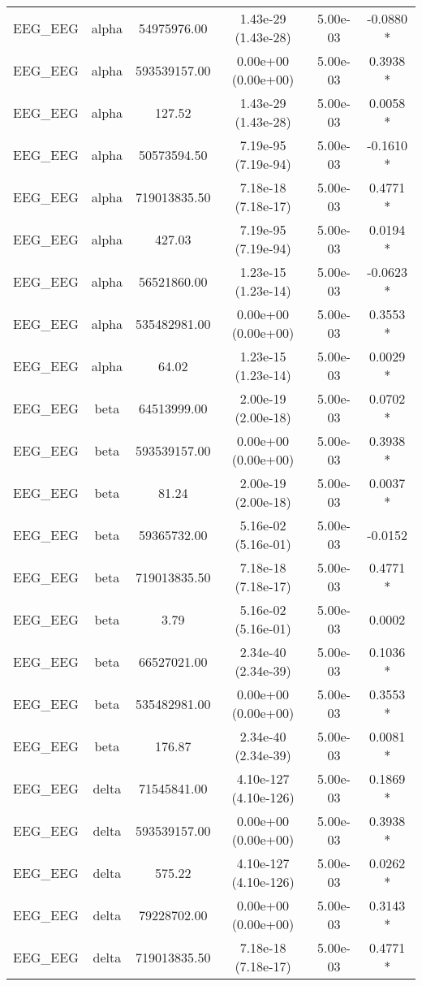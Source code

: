 \begin{tabular}{lccccc}
EEG\_EEG & alpha & 54975976.00 & 1.43e-29 (1.43e-28) & 5.00e-03 & -0.0880 * \\
EEG\_EEG & alpha & 593539157.00 & 0.00e+00 (0.00e+00) & 5.00e-03 & 0.3938 * \\
EEG\_EEG & alpha & 127.52 & 1.43e-29 (1.43e-28) & 5.00e-03 & 0.0058 * \\
EEG\_EEG & alpha & 50573594.50 & 7.19e-95 (7.19e-94) & 5.00e-03 & -0.1610 * \\
EEG\_EEG & alpha & 719013835.50 & 7.18e-18 (7.18e-17) & 5.00e-03 & 0.4771 * \\
EEG\_EEG & alpha & 427.03 & 7.19e-95 (7.19e-94) & 5.00e-03 & 0.0194 * \\
EEG\_EEG & alpha & 56521860.00 & 1.23e-15 (1.23e-14) & 5.00e-03 & -0.0623 * \\
EEG\_EEG & alpha & 535482981.00 & 0.00e+00 (0.00e+00) & 5.00e-03 & 0.3553 * \\
EEG\_EEG & alpha & 64.02 & 1.23e-15 (1.23e-14) & 5.00e-03 & 0.0029 * \\
EEG\_EEG & beta & 64513999.00 & 2.00e-19 (2.00e-18) & 5.00e-03 & 0.0702 * \\
EEG\_EEG & beta & 593539157.00 & 0.00e+00 (0.00e+00) & 5.00e-03 & 0.3938 * \\
EEG\_EEG & beta & 81.24 & 2.00e-19 (2.00e-18) & 5.00e-03 & 0.0037 * \\
EEG\_EEG & beta & 59365732.00 & 5.16e-02 (5.16e-01) & 5.00e-03 & -0.0152  \\
EEG\_EEG & beta & 719013835.50 & 7.18e-18 (7.18e-17) & 5.00e-03 & 0.4771 * \\
EEG\_EEG & beta & 3.79 & 5.16e-02 (5.16e-01) & 5.00e-03 & 0.0002  \\
EEG\_EEG & beta & 66527021.00 & 2.34e-40 (2.34e-39) & 5.00e-03 & 0.1036 * \\
EEG\_EEG & beta & 535482981.00 & 0.00e+00 (0.00e+00) & 5.00e-03 & 0.3553 * \\
EEG\_EEG & beta & 176.87 & 2.34e-40 (2.34e-39) & 5.00e-03 & 0.0081 * \\
EEG\_EEG & delta & 71545841.00 & 4.10e-127 (4.10e-126) & 5.00e-03 & 0.1869 * \\
EEG\_EEG & delta & 593539157.00 & 0.00e+00 (0.00e+00) & 5.00e-03 & 0.3938 * \\
EEG\_EEG & delta & 575.22 & 4.10e-127 (4.10e-126) & 5.00e-03 & 0.0262 * \\
EEG\_EEG & delta & 79228702.00 & 0.00e+00 (0.00e+00) & 5.00e-03 & 0.3143 * \\
EEG\_EEG & delta & 719013835.50 & 7.18e-18 (7.18e-17) & 5.00e-03 & 0.4771 * \\

\end{tabular}
